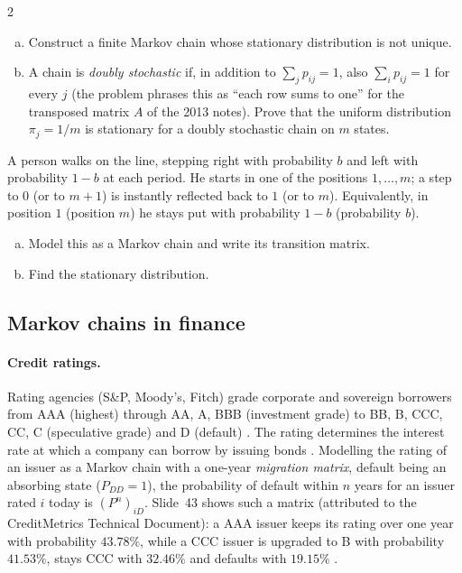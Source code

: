 \begin{paracol}{2}
\begin{exercise}[PS2 (2013), A-4]
\leavevmode
\begin{enumerate}[(a)]
  \item Construct a finite Markov chain whose stationary distribution is not unique.
  \item A chain is \emph{doubly stochastic} if, in addition to $\sum_jp_{ij}=1$, also $\sum_ip_{ij}=1$ for every $j$ (the
      problem phrases this as ``each row sums to one'' for the transposed matrix $A$ of the 2013 notes). Prove that the uniform
      distribution $\pi_j=1/m$ is stationary for a doubly stochastic chain on $m$ states.
\end{enumerate}
\end{exercise}

\begin{exercise}
A person walks on the line, stepping right with probability $b$ and left with probability $1-b$ at each period. He
starts in one of the positions $1,\dots,m$; a step to $0$ (or to $m+1$) is instantly reflected back to $1$ (or to $m$).
Equivalently, in position $1$ (position $m$) he stays put with probability $1-b$ (probability $b$).
\begin{enumerate}[(a)]
  \item Model this as a Markov chain and write its transition matrix.
  \item Find the stationary distribution.
\end{enumerate}
\end{exercise}

\subsection{Markov chains in finance}

\paragraph{Credit ratings.} Rating agencies (S\&P, Moody's, Fitch) grade corporate and sovereign borrowers
from AAA (highest) through AA, A, BBB (investment grade) to BB, B, CCC, CC, C (speculative grade) and D
(default) . The rating determines the interest rate at which a company can borrow by
issuing bonds . Modelling the rating of an issuer as a Markov chain with a one-year
\emph{migration matrix}, default being an absorbing state ($P_{DD}=1$), the probability of default within
$n$ years for an issuer rated $i$ today is $(P^n)_{iD}$. Slide~43 shows such a matrix (attributed to the
CreditMetrics Technical Document): a AAA issuer keeps its rating over one year with probability
$43.78\%$, while a CCC issuer is upgraded to B with probability $41.53\%$, stays CCC with $32.46\%$ and
defaults with $19.15\%$ .


\end{paracol}
